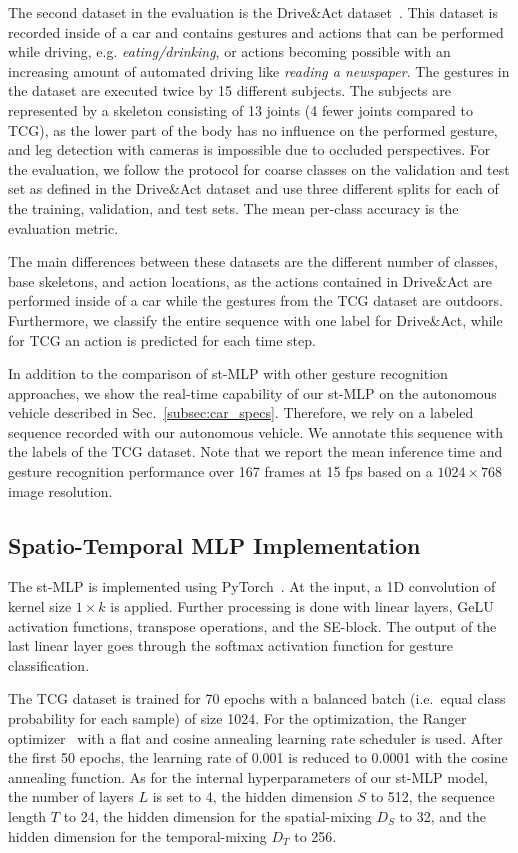 \documentclass[letterpaper, 10 pt, conference]{ieeeconf}
\begin{document}
The second dataset in the evaluation is the Drive\&Act dataset~\cite{drive_and_act_2019_iccv}. This dataset is recorded inside of a car and contains gestures and actions that can be performed while driving, e.g. \textit{eating/drinking}, or actions becoming possible with an increasing amount of automated driving like \textit{reading a newspaper}. The gestures in the dataset are executed twice by 15 different subjects. The subjects are represented by a skeleton consisting of 13 joints (4 fewer joints compared to TCG), as the lower part of the body has no influence on the performed gesture, and leg detection with cameras is impossible due to occluded perspectives. For the evaluation, we follow the protocol for coarse classes on the validation and test set as defined in the Drive\&Act dataset and use three different splits for each of the training, validation, and test sets. The mean per-class accuracy is the evaluation metric. 

The main differences between these datasets are the different number of classes, base skeletons, and action locations, as the actions contained in Drive\&Act are performed inside of a car while the gestures from the TCG dataset are outdoors. Furthermore, we classify the entire sequence with one label for Drive\&Act, while for TCG an action is predicted for each time step.

In addition to the comparison of st-MLP with other gesture recognition approaches, we show the real-time capability of our st-MLP on the autonomous vehicle described in Sec.~\ref{subsec:car_specs}. Therefore, we rely on a labeled sequence recorded with our autonomous vehicle. We annotate this sequence with the labels of the TCG dataset. Note that we report the mean inference time and gesture recognition performance over 167 frames at 15 fps based on a $1024 \times 768$ image resolution.

\subsection{Spatio-Temporal MLP Implementation}
\label{subsec:st_mlp}
The st-MLP is implemented using PyTorch~\cite{pytorch}. At the input, a 1D convolution of kernel size $1 \times k$ is applied. Further processing is done with linear layers, GeLU activation functions, transpose operations, and the SE-block. The output of the last linear layer goes through the softmax activation function for gesture classification.

The TCG dataset is trained for 70 epochs with a balanced batch (i.e.~equal class probability for each sample) of size 1024. For the optimization, the Ranger optimizer~\cite{Ranger} with a flat and cosine annealing learning rate scheduler is used. After the first 50 epochs, the learning rate of 0.001 is reduced to 0.0001 with the cosine annealing function. As for the internal hyperparameters of our st-MLP model, the number of layers $L$ is set to 4, the hidden dimension $S$ to 512, the sequence length $T$ to 24, the hidden dimension for the spatial-mixing $D_S$ to 32, and the hidden dimension for the temporal-mixing $D_T$ to 256. 
\end{document}
